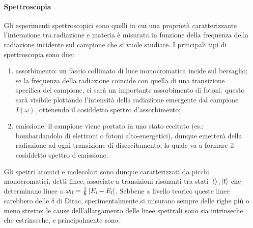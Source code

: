 \paragraph{Spettroscopia}

Gli esperimenti spettroscopici sono quelli in cui una proprietà caratterizzante l'interazione tra radiazione e materia è misurata in funzione della frequenza della radiazione incidente sul campione che si vuole studiare. I principali tipi di spettroscopia sono due:
\begin{enumerate}
	\item assorbimento: un fascio collimato di luce monocromatica incide sul bersaglio; se la frequenza della radiazione coincide con quella di una transizione specifica del campione, ci sarà un importante assorbimento di fotoni: questo sarà visibile plottando l'intensità della radiazione emergente dal campione $ I(\omega) $, ottenendo il cosiddetto spettro d'assorbimento;
	\item emissione: il campione viene portato in uno stato eccitato (es.: bombardandolo di elettroni o fotoni alto-energetici), dunque emetterà della radiazione ad ogni transizione di diseccitamento, la quale va a formare il cosiddetto spettro d'emissione.
\end{enumerate}
Gli spettri atomici e molecolari sono dunque caratterizzati da picchi monocromatici, detti linee, associate a transizioni risonanti tra stati $ \ket{\text{i}} , \ket{\text{f}} $ che determinano linee a $ \omega_\text{if} = \frac{1}{\hbar} \left\lvert E_\text{i} - E_\text{f}\right\rvert $. Sebbene a livello teorico queste linee sarebbero delle $ \delta $ di Dirac, sperimentalmente si misurano sempre delle righe più o meno strette; le cause dell'allargamento delle linee spettrali sono sia intrinseche che estrinseche, e principalmente sono:
